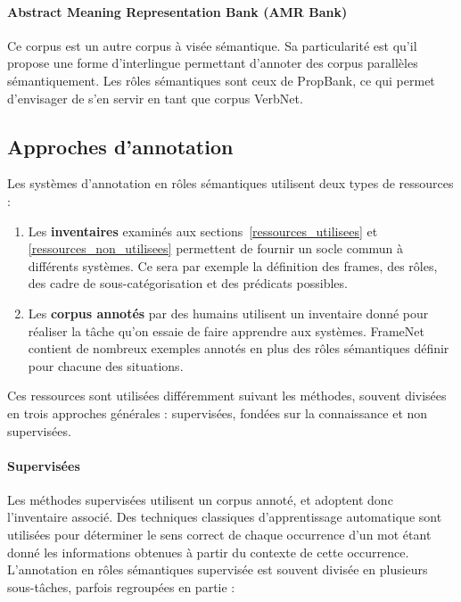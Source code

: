\paragraph{Abstract Meaning Representation Bank (AMR Bank)}

Ce corpus \citep{banarescu2013abstract} est un autre corpus à visée sémantique.
Sa particularité est qu'il propose une forme d'interlingue permettant d'annoter
des corpus parallèles sémantiquement. Les rôles sémantiques sont ceux de
PropBank, ce qui permet d'envisager de s'en servir en tant que corpus VerbNet.

\subsection{Approches d'annotation}

Les systèmes d'annotation en rôles sémantiques utilisent deux types de
ressources :

\begin{enumerate}
    \item Les \textbf{inventaires} examinés aux
        sections~\ref{ressources_utilisees} et \ref{ressources_non_utilisees}
        permettent de fournir un socle commun à différents systèmes. Ce sera
        par exemple la définition des frames, des rôles, des cadre de
        sous-catégorisation et des prédicats possibles.
    \item Les \textbf{corpus annotés} par des humains utilisent un inventaire
        donné pour réaliser la tâche qu'on essaie de faire apprendre aux
        systèmes. FrameNet contient de nombreux exemples annotés en plus des
        rôles sémantiques définir pour chacune des situations.
\end{enumerate}

Ces ressources sont utilisées différemment suivant les méthodes, souvent
divisées en trois approches générales : supervisées, fondées sur la
connaissance et non supervisées.

\paragraph{Supervisées}


Les méthodes supervisées
\citep{gildea2002automatic,surdeanu2008conll,das2014frame,hermann2014semantic,lluis2014shortest}
utilisent un corpus annoté, et adoptent donc l'inventaire associé. Des
techniques classiques d'apprentissage automatique sont utilisées pour
déterminer le sens correct de chaque occurrence d'un mot étant donné les
informations obtenues à partir du contexte de cette occurrence.  L'annotation
en rôles sémantiques supervisée est souvent divisée en plusieurs sous-tâches,
parfois regroupées en partie :

